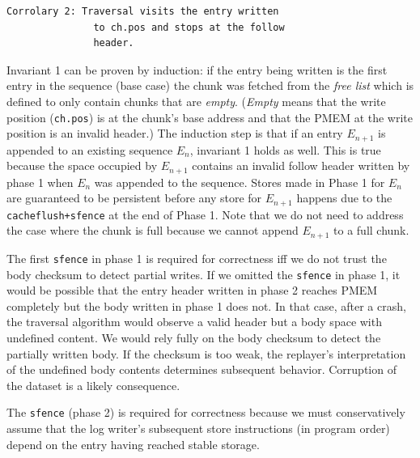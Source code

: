 \documentclass[12pt,a4paper,twoside]{book}
\begin{document}
{\begin{lstlisting}[style=figurepseudocode]
  Corrolary 2: Traversal visits the entry written
               to ch.pos and stops at the follow
               header.
\end{lstlisting}
Invariant 1 can be proven by induction:
if the entry being written is the first entry in the sequence (base case) the chunk was fetched from the \textit{free list} which is defined to only contain chunks that are \textit{empty}.
(\textit{Empty} means that the write position (\lstinline{ch.pos}) is at the chunk's base address and that the PMEM at the write position is an invalid header.)
The induction step is that if an entry $E_{n+1}$ is appended to an existing sequence $E_n$, invariant 1 holds as well.
This is true because the space occupied by $E_{n+1}$ contains an invalid follow header written by phase 1 when $E_n$ was appended to the sequence.
Stores made in Phase 1 for $E_n$ are guaranteed to be persistent before any store for $E_{n+1}$ happens due to the \lstinline{cacheflush+sfence} at the end of Phase 1.
Note that we do not need to address the case where the chunk is full because we cannot append $E_{n+1}$ to a full chunk.

The first \lstinline{sfence} in phase 1 is required for correctness iff we do not trust the body checksum to detect partial writes.
If we omitted the \lstinline{sfence} in phase 1, it would be possible that the entry header written in phase 2 reaches PMEM completely but the body written in phase 1 does not.
In that case, after a crash, the traversal algorithm would observe a valid header but a body space with undefined content.
We would rely fully on the body checksum to detect the partially written body.
If the checksum is too weak, the replayer's interpretation of the undefined body contents determines subsequent behavior.
Corruption of the dataset is a likely consequence.

The \lstinline{sfence} (phase 2) is required for correctness  because we must conservatively assume that the log writer's subsequent store instructions (in program order) depend on the entry having reached stable storage.

}
\end{document}
